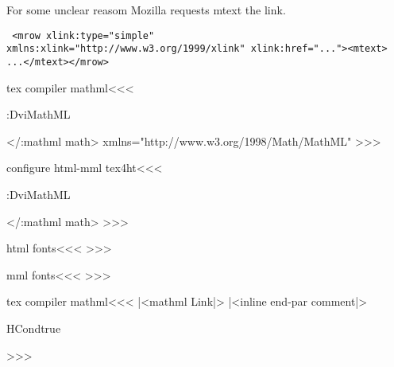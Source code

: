 {{For some unclear reasom Mozilla requests mtext the link.

\begin{verbatim} <mrow xlink:type="simple"
xmlns:xlink="http://www.w3.org/1999/xlink" xlink:href="..."><mtext>
...</mtext></mrow> \end{verbatim}




\<tex compiler mathml\><<<
    {\a:DviMathML \mathmltrue
       \ifOption{mml-fonts}{}{|%
       \IgnoreRule \HCode{<!--l.
       \the\inputlineno-->}\Tg<\a:mathml math\Hnewline
           \csname a:math-xmlns\endcsname \Hnewline \a:@math>\a:math
       |<sv dvimath par|>\IgnorePar}
    {\Tg</\a:mathml math>\EndIgnoreRule
     \ifOption{mml-fonts}{}{|%
     \mathmlfalse \b:DviMathML |<recall dvimath par|>}
  { xmlns="http://www.w3.org/1998/Math/MathML" }
>>>


\<configure html-mml tex4ht\><<<
    {\a:DviMathML \mathmltrue
       \ifOption{mml-fonts}{|<mml fonts|>}{|%
       \IgnoreRule \HCode{<!--l.
       \the\inputlineno-->}\Tg<\a:mathml math\Hnewline
           \csname a:math-xmlns\endcsname \Hnewline \a:@math>\a:math
       |<sv dvimath par|>\IgnorePar}
    {\Tg</\a:mathml math>\EndIgnoreRule
     \ifOption{mml-fonts}{|<html fonts|>}{|%
     \mathmlfalse \b:DviMathML |<recall dvimath par|>}
>>>

\<html fonts\><<<
%
>>>

\<mml fonts\><<<
%
>>>

\<tex compiler mathml\><<<
\newif\ifmathml \mathmlfalse
\newif\ifmtext \mtextfalse
|<mathml Link|>
\def\IgnoreRule{\ht:special{t4ht@\string_}}
\def\EndIgnoreRule{\ht:special{t4ht@\string_\string_}}
\Configure{$$} 
   {\IgnorePar
    |<inline end-par comment|>\EndP\DviMath}
   {\EndDviMath\ShowPar\par{\csname HCondtrue\endcsname\noindent}}
   {\DisplayMathtrue}
\Configure{$}
   {\DviMath}
   {\EndDviMath}{}
\newif\ifDisplayMath  \DisplayMathfalse
>>>


}}}}}}
